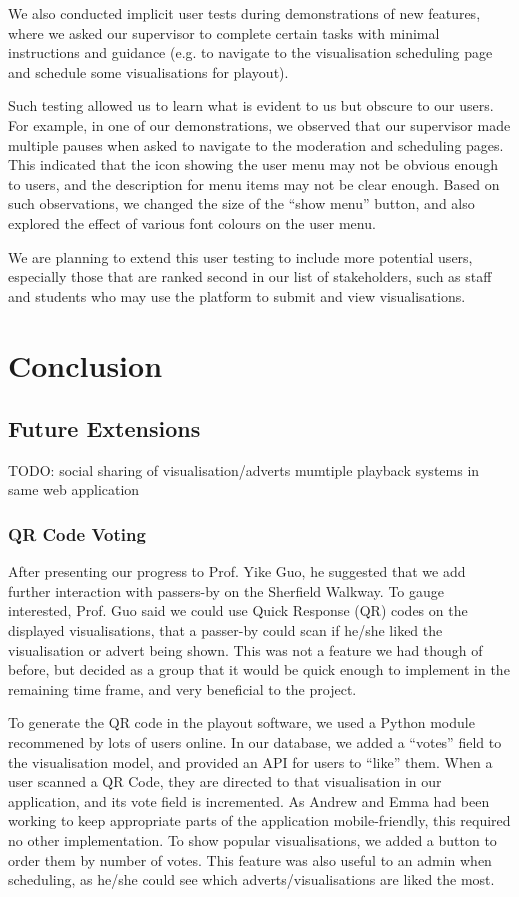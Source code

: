 \documentclass[a4paper, titlepage]{article}
\begin{document}
We also conducted implicit user tests during demonstrations of new features, where we asked our supervisor to complete certain tasks with minimal instructions and guidance (e.g. to navigate to the visualisation scheduling page and schedule some visualisations for playout).

Such testing allowed us to learn what is evident to us but obscure to our users. For example, in one of our demonstrations, we observed that our supervisor made multiple pauses when asked to navigate to the moderation and scheduling pages. This indicated that the icon showing the user menu may not be obvious enough to users, and the description for menu items may not be clear enough. Based on such observations, we changed the size of the ``show menu'' button, and also explored the effect of various font colours on the user menu.

We are planning to extend this user testing to include more potential users, especially those that are ranked second in our list of stakeholders, such as staff and students who may use the platform to submit and 
view visualisations.







\newpage
\section{Conclusion}

\subsection{Future Extensions}
TODO: 
social sharing of visualisation/adverts
mumtiple playback systems in same web application

\subsubsection{QR Code Voting}
After presenting our progress to Prof. Yike Guo, he suggested that we add further interaction with 
passers-by on the Sherfield Walkway. To gauge interested, Prof. Guo said we could use Quick Response 
(QR) codes on the displayed visualisations, that a passer-by could scan if he/she liked the 
visualisation or advert being shown. This was not a feature we had though of before, but decided as a 
group that it would be quick enough to implement in the remaining time frame, and very beneficial to
the project. 

To generate the QR code in the playout software, we used a Python module recommened by lots of users 
online. In our database, we added a ``votes'' field to the visualisation model, and provided an API
for users to ``like'' them. When a user scanned a QR Code, they are directed to that visualisation in 
our application, and its vote field is incremented. As Andrew and Emma had been working to keep 
appropriate parts of the application mobile-friendly, this required no other implementation. To show 
popular visualisations, we added a button to order them by number of votes. This feature was also 
useful to an admin when scheduling, as he/she could see which adverts/visualisations are liked the 
most. 
\end{document}
